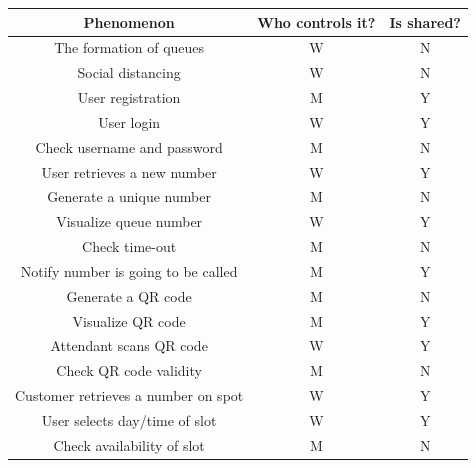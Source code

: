 \documentclass[table, 12pt]{article}
\begin{document}
\begin{center}
    \begin{table}
        \begin{tabular}{|c|c|c|}
            \hline
            \rowcolor{blue!50}
            Phenomenon                                 & Who controls it? & Is shared? \\
            \hline
            The formation of queues                    & W                & N          \\
            Social distancing                          & W                & N          \\
            User registration                          & M                & Y          \\
            User login                                 & W                & Y          \\
            Check username and password                & M                & N          \\
            User retrieves a new number                & W                & Y          \\
            Generate a unique number                   & M                & N          \\
            Visualize queue number                     & W                & Y          \\
            Check time-out                             & M                & N          \\
            Notify number is going to be called        & M                & Y          \\
            Generate a QR code                         & M                & N          \\
            Visualize QR code                          & M                & Y          \\
            Attendant scans QR code                    & W                & Y          \\
            Check QR code validity                     & M                & N          \\
            Customer retrieves a number on spot        & W                & Y          \\
            User selects day/time of slot              & W                & Y          \\
            Check availability of slot                 & M                & N          \\

\end{tabular}
\end{table}
\end{center}
\end{document}
